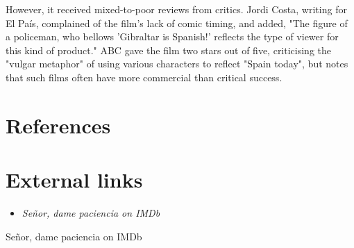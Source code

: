 However, it received mixed-to-poor reviews from critics. Jordi Costa,
writing for El País, complained of the film's lack of comic timing, and
added, "The figure of a policeman, who bellows 'Gibraltar is Spanish!'
reflects the type of viewer for this kind of product." ABC gave the film
two stars out of five, criticising the "vulgar metaphor" of using
various characters to reflect "Spain today", but notes that such films
often have more commercial than critical success.

\section{References}\label{references}

\section{External links}\label{external-links}

\begin{itemize}
\item
  \emph{Señor, dame paciencia on IMDb}
\end{itemize}

Señor, dame paciencia on IMDb
